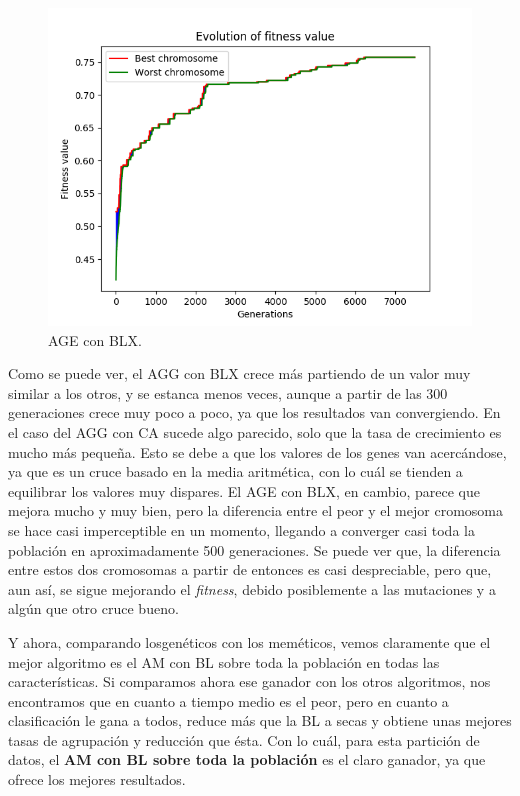 \documentclass[11pt,a4paper]{article}
\begin{document}
\begin{figure}[H]
\centering
\includegraphics[scale=0.6]{img/age-blx-colposcopy.png}
\caption{AGE con BLX.}
\end{figure}

Como se puede ver, el AGG con BLX crece más partiendo de un valor muy similar a los otros, y se estanca menos veces, aunque a
partir de las 300 generaciones crece muy poco a poco, ya que los resultados van convergiendo. En el caso del AGG con CA sucede
algo parecido, solo que la tasa de crecimiento es mucho más pequeña. Esto se debe a que los valores de los genes van acercándose,
ya que es un cruce basado en la media aritmética, con lo cuál se tienden a equilibrar los valores muy dispares. El AGE con BLX,
en cambio, parece que mejora mucho y muy bien, pero la diferencia entre el peor y el mejor cromosoma se hace casi imperceptible
en un momento, llegando a converger casi toda la población en aproximadamente 500 generaciones. Se puede ver que, la diferencia
entre estos dos cromosomas a partir de entonces es casi despreciable, pero que, aun así, se sigue mejorando el \textit{fitness},
debido posiblemente a las mutaciones y a algún que otro cruce bueno.

Y ahora, comparando losgenéticos con los meméticos, vemos claramente que el mejor algoritmo es el AM con BL sobre toda la 
población en todas las características. Si comparamos ahora ese ganador con los otros algoritmos, nos encontramos que en cuanto
a tiempo medio es el peor, pero en cuanto a clasificación le gana a todos, reduce más que la BL a secas y obtiene unas mejores
tasas de agrupación y reducción que ésta. Con lo cuál, para esta partición de datos, el \textbf{AM con BL sobre toda la población}
es el claro ganador, ya que ofrece los mejores resultados.
\end{document}
